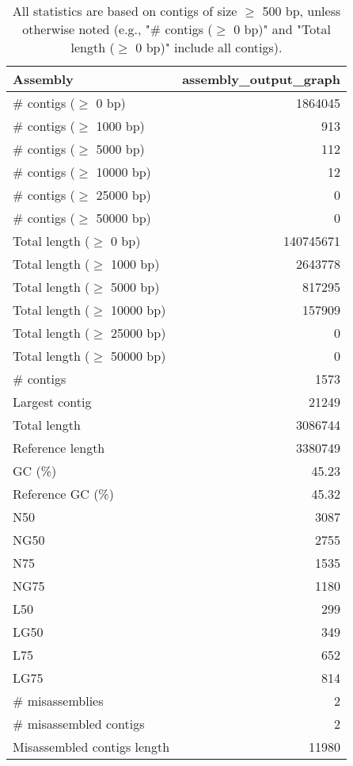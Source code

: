 \documentclass[12pt,a4paper]{article}
\begin{document}
\begin{table}[ht]
\begin{center}
\caption{All statistics are based on contigs of size $\geq$ 500 bp, unless otherwise noted (e.g., "\# contigs ($\geq$ 0 bp)" and "Total length ($\geq$ 0 bp)" include all contigs).}
\begin{tabular}{|l*{1}{|r}|}
\hline
Assembly & assembly\_output\_graph \\ \hline
\# contigs ($\geq$ 0 bp) & 1864045 \\ \hline
\# contigs ($\geq$ 1000 bp) & 913 \\ \hline
\# contigs ($\geq$ 5000 bp) & 112 \\ \hline
\# contigs ($\geq$ 10000 bp) & 12 \\ \hline
\# contigs ($\geq$ 25000 bp) & 0 \\ \hline
\# contigs ($\geq$ 50000 bp) & 0 \\ \hline
Total length ($\geq$ 0 bp) & 140745671 \\ \hline
Total length ($\geq$ 1000 bp) & 2643778 \\ \hline
Total length ($\geq$ 5000 bp) & 817295 \\ \hline
Total length ($\geq$ 10000 bp) & 157909 \\ \hline
Total length ($\geq$ 25000 bp) & 0 \\ \hline
Total length ($\geq$ 50000 bp) & 0 \\ \hline
\# contigs & 1573 \\ \hline
Largest contig & 21249 \\ \hline
Total length & 3086744 \\ \hline
Reference length & 3380749 \\ \hline
GC (\%) & 45.23 \\ \hline
Reference GC (\%) & 45.32 \\ \hline
N50 & 3087 \\ \hline
NG50 & 2755 \\ \hline
N75 & 1535 \\ \hline
NG75 & 1180 \\ \hline
L50 & 299 \\ \hline
LG50 & 349 \\ \hline
L75 & 652 \\ \hline
LG75 & 814 \\ \hline
\# misassemblies & 2 \\ \hline
\# misassembled contigs & 2 \\ \hline
Misassembled contigs length & 11980 \\ \hline

\end{tabular}
\end{center}
\end{table}
\end{document}
